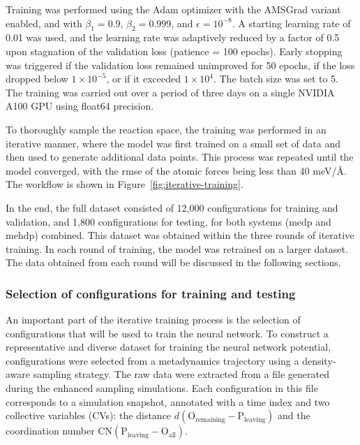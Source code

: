 Training was performed using the Adam optimizer with the AMSGrad variant enabled, and with $\beta_1 = 0.9$, $\beta_2 = 0.999$, and $\epsilon = 10^{-8}$. A starting learning rate of 0.01 was used, and the learning rate was adaptively reduced by a factor of 0.5 upon stagnation of the validation loss (patience = 100 epochs). Early stopping was triggered if the validation loss remained unimproved for 50 epochs, if the loss dropped below $1 \times 10^{-5}$, or if it exceeded $1 \times 10^{4}$. The batch size was set to 5. The training was carried out over a period of three days on a single NVIDIA A100 GPU using float64 precision.

To thoroughly sample the reaction space, the training was performed in an iterative manner, where the model was first trained on a small set of data and then used to generate additional data points. This process was repeated until the model converged, with the \ac{rmse} of the atomic forces being less than 40 meV/\AA. The workflow is shown in Figure~\ref{fig:iterative-training}.

In the end, the full dataset consisted of 12,000 configurations for training and validation, and 1,800 configurations for testing, for both systems (\ac{medp} and \ac{mehdp}) combined. This dataset was obtained within the three rounds of iterative training. In each round of training, the model was retrained on a larger dataset. The data obtained from each round will be discussed in the following sections.



\subsubsection{Selection of configurations for training and testing}

An important part of the iterative training process is the selection of configurations that will be used to train the neural network. To construct a representative and diverse dataset for training the neural network potential, configurations were selected from a metadynamics trajectory using a density-aware sampling strategy. The raw data were extracted from a file generated during the enhanced sampling simulations. Each configuration in this file corresponds to a simulation snapshot, annotated with a time index and two collective variables (CVs): the distance $d(\mathrm{O}_\text{remaining} - \mathrm{P}_\text{leaving})$ and the coordination number $\mathrm{CN}(\mathrm{P}_\text{leaving} - \mathrm{O}_\text{all})$.

